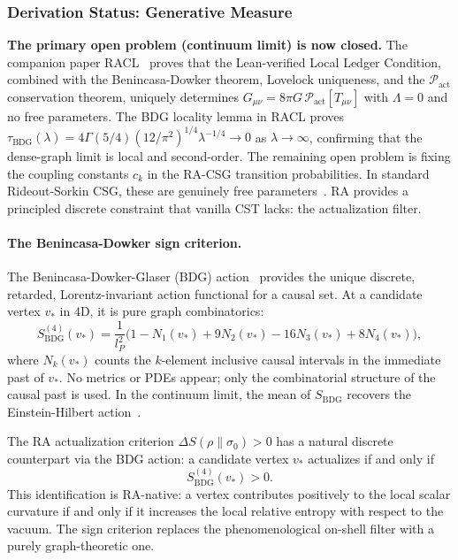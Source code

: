 \documentclass[11pt,a4paper]{article}
\theoremstyle{plain}
\theoremstyle{definition}
\theoremstyle{remark}
\begin{document}
\subsubsection{Derivation Status: Generative Measure}

\textbf{The primary open problem (continuum limit) is now closed.}
The companion paper RACL~\citep{Sandeman2026RACL} proves that the
Lean-verified Local Ledger Condition, combined with the Benincasa-Dowker
theorem, Lovelock uniqueness, and the $\mathcal{P}_{\mathrm{act}}$
conservation theorem, uniquely determines
$G_{\mu\nu} = 8\pi G\,\mathcal{P}_{\mathrm{act}}[T_{\mu\nu}]$ with
$\Lambda = 0$ and no free parameters. The BDG locality lemma in RACL
proves $\tau_{\mathrm{BDG}}(\lambda) = 4\Gamma(5/4)(12/\pi^2)^{1/4}
\lambda^{-1/4} \to 0$ as $\lambda \to \infty$, confirming that
the dense-graph limit is local and second-order.
The remaining open problem is fixing the coupling constants $c_k$ in the RA-CSG
transition probabilities. In standard Rideout-Sorkin CSG, these are genuinely
free parameters~\citep{Sorkin2003}. RA provides a principled discrete constraint
that vanilla CST lacks: the actualization filter.

\paragraph{The Benincasa-Dowker sign criterion.}
The Benincasa-Dowker-Glaser (BDG) action~\citep{Benincasa2010} provides the
unique discrete, retarded, Lorentz-invariant action functional for a causal set.
At a candidate vertex $v_*$ in 4D, it is pure graph combinatorics:
\begin{equation}
  S_{\mathrm{BDG}}^{(4)}(v_*)
  = \frac{1}{l_P^2}
    \bigl(1 - N_1(v_*) + 9N_2(v_*) - 16N_3(v_*) + 8N_4(v_*)\bigr),
  \label{eq:BDG}
\end{equation}
where $N_k(v_*)$ counts the $k$-element inclusive causal intervals in the
immediate past of $v_*$. No metrics or PDEs appear; only the combinatorial
structure of the causal past is used. In the continuum limit, the mean of
$S_{\mathrm{BDG}}$ recovers the Einstein-Hilbert action~\citep{Benincasa2010}.

The RA actualization criterion $\Delta S(\rho\|\sigma_0) > 0$ has a natural
discrete counterpart via the BDG action: a candidate vertex $v_*$ actualizes
if and only if
\begin{equation}
  S_{\mathrm{BDG}}^{(4)}(v_*) > 0.
  \label{eq:BDG_filter}
\end{equation}
This identification is RA-native: a vertex contributes positively to the local
scalar curvature if and only if it increases the local relative entropy with
respect to the vacuum. The sign criterion replaces the phenomenological
on-shell filter with a purely graph-theoretic one.
\end{document}
